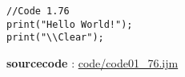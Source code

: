 \begin{lstlisting}
//Code 1.76
print("Hello World!");
print("\\Clear");

\end{lstlisting}
\textbf{sourcecode} : \href{http://www.example.com/contents}{code/code01\_76.ijm}